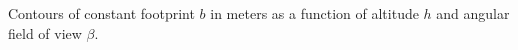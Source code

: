 \label{fig:footprint} Contours of constant footprint $b$ in meters as a function of altitude $h$ and angular field of view $\beta$.